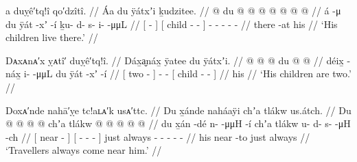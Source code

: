 
\ex\label{ex:92-2-children-live-there}%
%
\begingl
	\glpreamble	a duỵê′tq!î qo′dzîtî.  //
	\glpreamble	Áa du ÿátxʼi ḵudzitee. //
	\gla	{}  @ {} {} {} du  @ {} @ {} {}
		 @ {} @ {} @ {} @ {} @ {} //
	\glb	{} á -μ {} {} du ÿát -xʼ -í {}
		ḵu- d- s- i-  -μμL //
	\glc	{}[  - {}]
		{}[  child - - {}]
		- - - -  - //
	\gld	{} there -at {} {} his  {} {} {}
		 {} {} {} {} {} //
	\glft	‘His children live there.’
		//
\endgl
\xe

\ex\label{ex:92-3-his-children-are-two}%
%
\begingl
	\glpreamble	Dᴀxᴀnᴀ′x ỵᴀtî′ duỵê′tq!î. //
	\glpreamble	Dáx̱a̬náx̱ ÿatee du ÿátxʼi. //
	\gla	{}  @ {} {}  @ {} @ {}
		{} du  @ {} @ {} {} //
	\glb	{} déix̱ -náx̱ {} i-  -μμL
		{} du ÿát -xʼ -í {} //
	\glc	{}[ two - {}] -  -
		{}[  child - - {}] //
	\gld	{}  {} {}  {} {}
		{} his  {} {} {} //
	\glft	‘His children are two.’
		//
\endgl
\xe

\ex\label{ex:92-4-travellers-always-visit}%
%
\begingl
	\glpreamble	Doxᴀ′nde nahā′ỵe tc!aʟᴀ′k usᴀ′ttc. //
	\glpreamble	Du x̱ánde naháaÿi chʼa tlákw us.átch. //
	\gla	{} Du  @ {} {}
		{}  @ {} @ {} @ {} {}
		chʼa tlákw  @ {} @ {} @ {} @ {} @ {} //
	\glb	{} du x̱án -dé {}
		{} n-  -μμH -í {}
		chʼa tlákw u- d- s-  -μH -ch //
	\glc	{}[  near - {}]
		{}[ -  - - {}]
		just always - - -
			 - - //
	\gld	{} his near -to {}
		{}  {} {} {} {}
		just always  {} {} {} {} {} //
	\glft	‘Travellers always come near him.’
		//
\endgl
\xe


